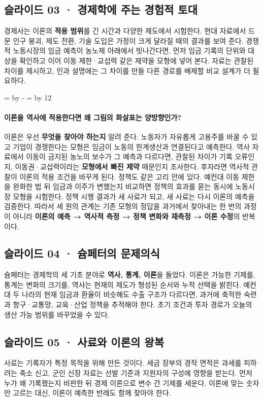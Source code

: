 \documentclass[10pt,a4paper]{article}
\newcommand{\ReserveQuestionSpace}{%
  \par\begingroup
  \dimen0=\pagegoal \advance\dimen0 by -\pagetotal
  \dimen2=\baselineskip \multiply\dimen2 by 12
  \ifdim\dimen0<\dimen2 \newpage\fi
  \endgroup}
\begin{document}
\subsection{슬라이드 03 · 경제학에 주는 경험적 토대}
경제사는 이론의 \textbf{적용 범위}를 긴 시간과 다양한 제도에서 시험한다. 현대 자료에서 드문 인구 붕괴, 제도 전환, 기술 도입은 가정이 크게 달라질 때의 결과를 보여 준다. 경쟁적 노동시장의 임금 예측이 농노제 아래에서 빗나간다면, 먼저 임금 기록의 단위와 대상을 확인하고 이어 이동 제한·교섭력 같은 제약을 모형에 넣어 본다. 자료는 관찰된 차이를 제시하고, 인과 설명에는 그 차이를 만들 다른 경로를 배제할 비교 설계가 더 필요하다.\par

\ReserveQuestionSpace
\paragraph{이론을 역사에 적용한다면 왜 그림의 화살표는 양방향인가?}
이론은 우선 \textbf{무엇을 찾아야 하는지} 알려 준다. 노동자가 자유롭게 고용주를 바꿀 수 있고 기업이 경쟁한다는 모형은 임금이 노동의 한계생산과 연결된다고 예측한다. 역사 자료에서 이동이 금지된 농노의 보수가 그 예측과 다르다면, 관찰된 차이가 기록 오류인지, 이동권·교섭력이라는 \textbf{모형에서 빠진 제약} 때문인지 조사한다. 후자라면 역사적 관찰이 이론의 적용 조건을 바꾸게 된다. 정책도 같은 고리 안에 있다. 예컨대 이동 제한을 완화한 법 뒤 임금과 이주가 변했는지 비교하면 정책의 효과를 묻는 동시에 노동시장 모형을 시험한다. 정책 시행 결과가 새 사료가 되고, 새 사료는 다시 이론의 예측을 검증한다. 따라서 세 원의 관계는 기존 모형의 정답을 과거에서 찾아내는 한 번의 과정이 아니라 \textbf{이론의 예측 → 역사적 측정 → 정책 변화와 재측정 → 이론 수정}의 반복이다.\par

\subsection{슬라이드 04 · 슘페터의 문제의식}
슘페터는 경제학의 세 기초 분야로 \textbf{역사, 통계, 이론}을 들었다. 이론은 가능한 기제를, 통계는 변화의 크기를, 역사는 현재의 제도가 형성된 순서와 누적 선택을 밝힌다. 예컨대 두 나라의 현재 임금과 환율이 비슷해도 수출 구조가 다르다면, 과거에 축적한 숙련과 항구·교통망, 교육·산업 정책을 추적해야 한다. 초기 조건과 투자 경로가 오늘의 생산 가능 범위를 바꾸었을 수 있다.\par

\subsection{슬라이드 05 · 사료와 이론의 왕복}
사료는 기록자가 특정 목적을 위해 만든 것이다. 세금 장부의 경작 면적은 과세를 피하려는 축소 신고, 군인 신장 자료는 선발 기준과 지원자의 구성에 영향을 받는다. 먼저 누가 왜 기록했는지 비판한 뒤 경제 이론으로 변수 간 기제를 세운다. 이론에 맞는 숫자만 고르는 대신, 이론이 예측한 반례도 함께 찾아야 한다.\par
\end{document}
